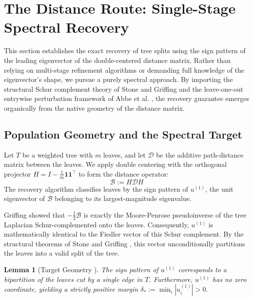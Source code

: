 \documentclass[11pt]{article}
\newtheorem{lemma}{Lemma}
\begin{document}
\section{The Distance Route: Single-Stage Spectral Recovery}

This section establishes the exact recovery of tree splits using the sign pattern of the leading eigenvector of the double-centered distance matrix. Rather than relying on multi-stage refinement algorithms or demanding full knowledge of the eigenvector's shape, we pursue a purely spectral approach. By importing the structural Schur complement theory of Stone and Griffing \cite{stone2009fiedler} and the leave-one-out entrywise perturbation framework of Abbe et al. \cite{abbe2020entrywise}, the recovery guarantee emerges organically from the native geometry of the distance matrix.

\subsection{Population Geometry and the Spectral Target}
\label{sec:target}

Let $T$ be a weighted tree with $m$ leaves, and let $\mathcal{D}$ be the additive path-distance matrix between the leaves. We apply double centering with the orthogonal projector $H = I - \frac{1}{m}\mathbf{1}\mathbf{1}^\top$ to form the distance operator:
\begin{equation}
\mathcal{B} := H \mathcal{D} H
\end{equation}
The recovery algorithm classifies leaves by the sign pattern of $u^{(1)}$, the unit eigenvector of $\mathcal{B}$ belonging to its largest-magnitude eigenvalue.

Griffing \cite{griffing2012} showed that $-\frac{1}{2}\mathcal{B}$ is exactly the Moore-Penrose pseudoinverse of the tree Laplacian Schur-complemented onto the leaves. Consequently, $u^{(1)}$ is mathematically identical to the Fiedler vector of this Schur complement. By the structural theorems of Stone and Griffing \cite{stone2009fiedler}, this vector unconditionally partitions the leaves into a valid split of the tree.

\begin{lemma}[Target Geometry \cite{stone2009fiedler}]
The sign pattern of $u^{(1)}$ corresponds to a bipartition of the leaves cut by a single edge in $T$. Furthermore, $u^{(1)}$ has no zero coordinate, yielding a strictly positive margin $\delta_* := \min_i |u_i^{(1)}| > 0$.
\end{lemma}
\end{document}
